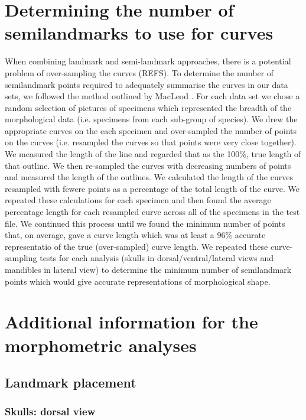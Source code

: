 \documentclass[12pt,a4paper]{article}
\begin{document}
\section{Determining the number of semilandmarks to use for curves}
	When combining landmark and semi-landmark approaches, there is a potential problem of over-sampling the curves (REFS). To determine the number of semilandmark points required to adequately summarise the curves in our data sets,  we followed the method outlined by MacLeod \citeyearpar{MacLeod2012}. 
	For each data set we chose a random selection of pictures of specimens which represented the breadth of the morphological data (i.e. specimens from each sub-group of species).  We drew the appropriate curves on the each specimen and over-sampled the number of points on the curves (i.e. resampled the curves so that points were very close together). 
	We measured the length of the line and regarded that as the 100\%, true length of that outline. We then re-sampled the curves with decreasing numbers of points and measured the length of the outlines. We calculated the length of the curves resampled with fewere points as a percentage of the total length of the curve. We repeated these calculations for each specimen and then found the average percentage length for each resampled curve across all of the specimens in the test file. We continued this process until we found the minimum number of points that, on average, gave a curve length which was at least a 96\% accurate representatio of the true (over-sampled) curve length.  
	We repeated these curve-sampling tests for each analysis (skulls in dorsal/ventral/lateral views and mandibles in lateral view) to determine the minimum number of semilandmark points which would give accurate representations of morphological shape.

\section{Additional information for the morphometric analyses}

\subsection{Landmark placement}

\subsubsection{Skulls: dorsal view}
\end{document}
